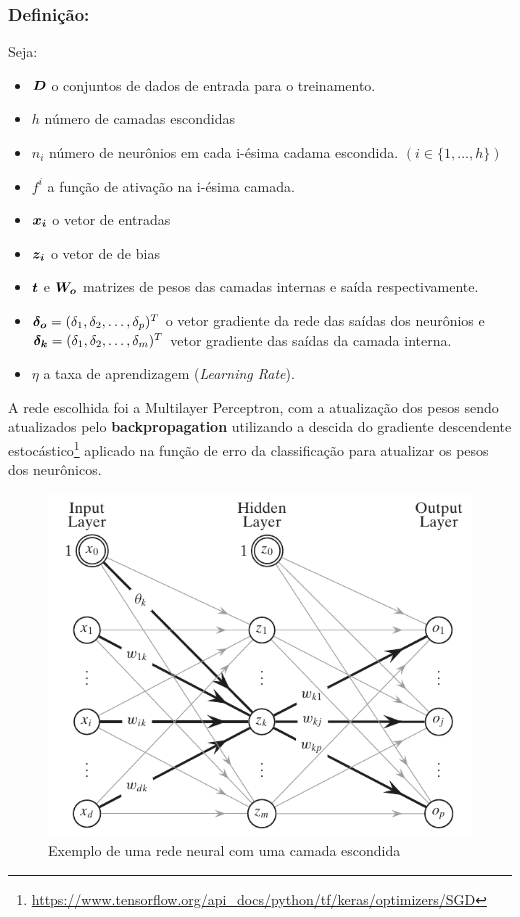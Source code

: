 \subsubsection*{\textbf{Definição}:}

Seja:
\begin{itemize}
    \item $\boldsymbol{D}$ o conjuntos de dados de entrada para o treinamento.
    \item $h$ número de camadas escondidas
    \item $n_i$ número de neurônios em cada i-ésima cadama escondida. $(i \in \{1,\dots, h\})$
    \item $f^{i}$ a função de ativação na i-ésima camada. 
    \item $\boldsymbol{x_i}$ o vetor de entradas
    \item $\boldsymbol{z_i}$ o vetor de de bias
    \item $\boldsymbol{t}$ e $\boldsymbol{W_o}$ matrizes de pesos das camadas internas e saída respectivamente.
    \item $\boldsymbol{\delta_o} = (\delta_1, \delta_2, \dots, \delta_p)^{T}$ o vetor gradiente da rede das saídas dos neurônios e $\boldsymbol{\delta_k} = (\delta_1, \delta_2, \dots, \delta_m)^{T}$ vetor gradiente das saídas da camada interna.
    \item $\eta$ a taxa de aprendizagem (\textit{Learning Rate}).
\end{itemize}

A rede escolhida foi a Multilayer Perceptron, com a atualização dos pesos sendo atualizados pelo \textbf{backpropagation} utilizando a descida do gradiente descendente estocástico\footnote{\url{https://www.tensorflow.org/api_docs/python/tf/keras/optimizers/SGD}} aplicado na função de erro da classificação para atualizar os pesos dos neurônicos.


\begin{figure}[H]
  \centering
  \includegraphics{pdf/NeuralNetwork.pdf}
  \caption{Exemplo de uma rede neural com uma camada escondida}
  \label{fig:neuralnetwork}
\end{figure}

